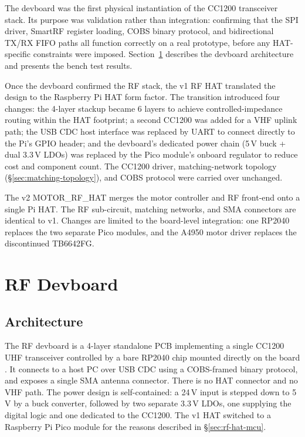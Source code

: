 The devboard was the first physical instantiation of the CC1200 transceiver stack. Its purpose was validation rather than integration: confirming that the SPI driver, SmartRF register loading, COBS binary protocol, and bidirectional TX/RX FIFO paths all function correctly on a real prototype, before any HAT-specific constraints were imposed. Section~\ref{sec:rf-devboard} describes the devboard architecture and presents the bench test results.

Once the devboard confirmed the RF stack, the v1 RF HAT translated the design to the Raspberry Pi HAT form factor. The transition introduced four changes: the 4-layer stackup became 6 layers to achieve controlled-impedance routing within the HAT footprint; a second CC1200 was added for a VHF uplink path; the USB CDC host interface was replaced by UART to connect directly to the Pi's GPIO header; and the devboard's dedicated power chain (5\,V buck + dual 3.3\,V LDOs) was replaced by the Pico module's onboard regulator to reduce cost and component count. The CC1200 driver, matching-network topology (\S\ref{sec:matching-topology}), and COBS protocol were carried over unchanged.

The v2 MOTOR\_RF\_HAT merges the motor controller and RF front-end onto a single Pi HAT. The RF sub-circuit, matching networks, and SMA connectors are identical to v1. Changes are limited to the board-level integration: one RP2040 replaces the two separate Pico modules, and the A4950 motor driver replaces the discontinued TB6642FG.
\section{RF Devboard}
\label{sec:rf-devboard}

\subsection{Architecture}

The RF devboard is a 4-layer standalone PCB implementing a single CC1200 UHF transceiver controlled by a bare RP2040 chip mounted directly on the board \cite{rp2040ds}. It connects to a host PC over USB CDC using a COBS-framed binary protocol, and exposes a single SMA antenna connector. There is no HAT connector and no VHF path. The power design is self-contained: a 24\,V input is stepped down to 5\,V by a buck converter, followed by two separate 3.3\,V LDOs, one supplying the digital logic and one dedicated to the CC1200. The v1 HAT switched to a Raspberry Pi Pico module for the reasons described in \S\ref{sec:rf-hat-mcu}.

